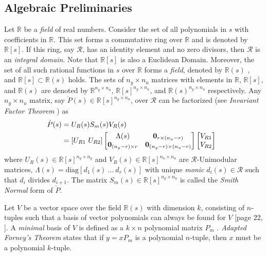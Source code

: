 \documentclass[journal]{IEEEtran}
\theoremstyle{remark}
\begin{document}
\subsection{Algebraic Preliminaries} \label{sec:algebraic background}
Let \( \mathbb{R} \) be a \textit{field} of real numbers. Consider the set of all polynomials in \( s \) with coefficients in \( \mathbb{R} \). This set forms a commutative ring over \( \mathbb{R} \) and is denoted by \( \mathbb{R}[s] \). If this ring, say \( \mathcal{R} \), has an identity element and no zero divisors, then \( \mathcal{R} \) is an \textit{integral domain}. Note that \( \mathbb{R}[s] \) is also a Euclidean Domain. 
Moreover, the set of all such rational functions in \( s \) over \( \mathbb{R} \) forms a \textit{field}, denoted by \( \mathbb{R}(s) \) \cite{forney1975minimal}, and \( \mathbb{R}[s] \subset \mathbb{R}(s) \) holds. The sets of \( n_y \times n_u \) matrices with elements in \( \mathbb{R} \), \( \mathbb{R}[s] \), and \( \mathbb{R}(s) \) are denoted by \( \mathbb{R}^{n_y \times n_u} \), \( \mathbb{R}[s]^{n_y \times n_u} \), and \( \mathbb{R}(s)^{n_y \times n_u} \) respectively.  Any $n_y \times n_u$ matrix, say $ \grave{P}(s) \in \mathbb{R}[s]^{n_y \times n_u}$, over $\mathcal{R}$ 
 can be factorized (see \textit{Invariant Factor Theorem} \cite[Theorem 2.1]{kuijper2012first}) as
 \begin{align} \label{eq:invariantfactor}
 \hspace{-0.2cm}
   \grave{P}(s)&=U_R(s)S_m(s)V_R(s) \nonumber \\   
   &=[{U}_{R1} \ {U}_{R2}]  \begin{bmatrix}
    \Lambda(s) & \textbf{0}_{r \times (n_u-r)}\\
    \textbf{0}_{(n_y-r)\times r} & \textbf{0}_{(n_y-r)\times (n_u-r)}
\end{bmatrix}{\begin{bmatrix}
    {V}_{R1} \\
    {V}_{R2}
\end{bmatrix}}
 \end{align}
where $U_R(s) \in \mathbb{R}[s]^{n_y \times n_y}$ and $V_R(s) \in \mathbb{R}[s]^{n_u \times n_u}$ are $\mathcal{R}$-Unimodular matrices, $\Lambda(s)=\text{diag}[d_1(s) \ \dots \ d_r(s)]$ with unique \textit{monic} $d_i(s) \in \mathcal{R}$ such that $d_i$ divides $d_{i+1}$. The matrix $S_m(s) \in \mathbb{R}[s]^{n_y \times n_u}$ is called the \textit{Smith Normal} form of $\grave{P}$.

Let $V$ be a vector space over the field $\mathbb{R}(s)$ with dimension $k$, consisting of $n$-tuples such that a basis of vector polynomials can always be found for \( V \) [page 22, \cite{amparan2021minimal}]. A \textit{minimal} basis of $V$ is defined as a $k \times n$ polynomial matrix $P_m$ \cite{forney1975minimal}. \textit{Adapted Forney's Theorem} \cite[Section 3(4.)]{forney1975minimal} states that if $y = xP_m$ is a polynomial $n$-tuple, then $x$ must be a polynomial $k$-tuple.
\end{document}
